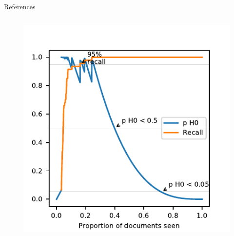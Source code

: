 \documentclass[9pt, aspectratio=169]{beamer}
\begin{document}
\begin{frame}{References}
\tiny

\end{frame}

\begin{frame}
	\begin{columns}
		\begin{column}{0.5\linewidth}
			\begin{figure}
				\includegraphics[width=\linewidth]{../manuscript/2_figs_h0_paths_Radjenovic}
			\end{figure}
		\end{column}
	

\end{columns}
\end{frame}
\end{document}
